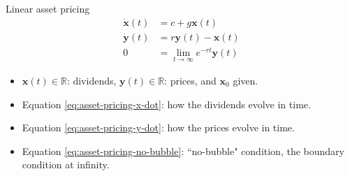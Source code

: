 \documentclass[aspectratio=169,10pt]{beamer}
\begin{document}
\begin{frame}{Linear asset pricing}
\begin{align}
	\dot{\mathbf{x}}(t) &= c + g \mathbf{x}(t) \label{eq:asset-pricing-x-dot}\\%
	\dot{\mathbf{y}}(t) &= r \mathbf{y}(t) - \mathbf{x}(t)  \label{eq:asset-pricing-y-dot}\\%
	0 &= \lim_{t\rightarrow \infty} e^{-r t}\mathbf{y}(t) \label{eq:asset-pricing-no-bubble}%
\end{align}

\begin{itemize}
	\item $\mathbf{x}(t)\in \mathbb{R}$: dividends, $\mathbf{y}(t)\in \mathbb{R}$: prices, and $\mathbf{x}_0$ given. 
	\vspace{0.1in}
	\item Equation \cref{eq:asset-pricing-x-dot}: how the dividends evolve in time.
	\vspace{0.1in}
	\item  Equation \cref{eq:asset-pricing-y-dot}: how the prices evolve in time.
	\vspace{0.1in}
	\item Equation \cref{eq:asset-pricing-no-bubble}: ``no-bubble" condition, the boundary condition at infinity. 
	\end{itemize}
\end{frame}
\end{document}
